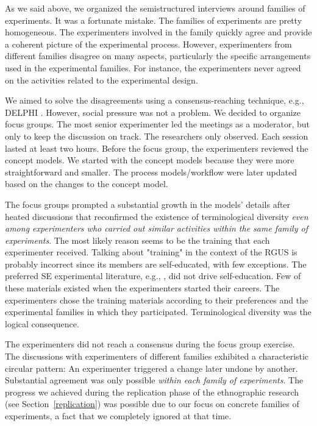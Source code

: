 As we said above, we organized the semistructured interviews around families of experiments. It was a fortunate mistake. The families of experiments are pretty homogeneous. The experimenters involved in the family quickly agree and provide a coherent picture of the experimental process. However, experimenters from different families disagree on many aspects, particularly the specific arrangements used in the experimental families. For instance, the experimenters never agreed on the activities related to the experimental design.

We aimed to solve the disagreements using a consensus-reaching technique, e.g., DELPHI \cite{Dalkey-1967-Delphi}. However, social pressure was not a problem. We decided to organize focus groups. The most senior experimenter led the meetings as a moderator, but only to keep the discussion on track. The researchers only observed. Each session lasted at least two hours. Before the focus group, the experimenters reviewed the concept models. We started with the concept models because they were more straightforward and smaller. The process models/workflow were later updated based on the changes to the concept model.

The focus groups prompted a substantial growth in the models' details after heated discussions that reconfirmed the existence of terminological diversity \textit{even among experimenters who carried out similar activities within the same family of experiments}. The most likely reason seems to be the training that each experimenter received. Talking about "training" in the context of the RGUS is probably incorrect since its members are self-educated, with few exceptions. The preferred SE experimental literature, e.g., \cite{Creswell-2009-Method-Approaches,montgomery-2019-Design-Analysis-Experiments}, did not drive self-education. Few of these materials existed when the experimenters started their careers. The experimenters chose the training materials according to their preferences and the experimental families in which they participated. Terminological diversity was the logical consequence.

The experimenters did not reach a consensus during the focus group exercise. The discussions with experimenters of different families exhibited a characteristic circular pattern: An experimenter triggered a change later undone by another. Substantial agreement was only possible \textit{within each family of experiments}. The progress we achieved during the replication phase of the ethnographic research (see Section~\ref {replication}) was possible due to our focus on concrete families of experiments, a fact that we completely ignored at that time.

